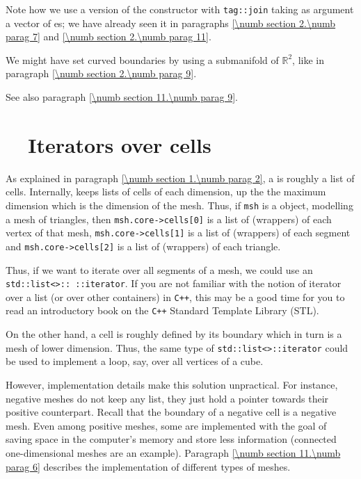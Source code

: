 Note how we use a version of the {\small\tt {}} constructor with {\small\tt \textcolor{tag}{tag}::join}
taking as argument a vector of {\small\tt {}}es; we have already seen it in paragraphs
\ref{\numb section 2.\numb parag 7} and \ref{\numb section 2.\numb parag 11}.

We might have set curved boundaries by using a submanifold of $ \mathbb{R}^2 $, like in paragraph
\ref{\numb section 2.\numb parag 9}.

See also paragraph \ref{\numb section 11.\numb parag 9}.


\section{~~Iterators over cells}\label{\numb section 9.\numb parag 3}

As explained in paragraph \ref{\numb section 1.\numb parag 2}, a {\small\tt {}} is
roughly a list of cells.
Internally, {\maniFEM} keeps lists of cells of each dimension, up the the maximum
dimension which is the dimension of the mesh.
Thus, if {\small\tt msh} is a {\small\tt {}} object, modelling a
mesh of triangles, then {\small\tt msh.core->cells[0]} is a list of (wrappers) of
each vertex of that mesh, {\small\tt msh.core->cells[1]} is a list of (wrappers) of
each segment and {\small\tt msh.core->cells[2]} is a list of (wrappers) of each triangle.

Thus, if we want to iterate over all segments of a mesh, we could use an
{\small\tt std::list<>:: ::iterator}.
If you are not familiar with the notion of iterator over a list (or over other containers)
in {\tt C++}, this may be a good time for you to read an introductory book on the
{\tt C++} Standard Template Library (STL).

On the other hand, a cell is roughly defined by its boundary which in turn is a mesh of
lower dimension.
Thus, the same type of {\small\tt std::list<>::iterator} could be used to
implement a loop, say, over all vertices of a cube.

However, implementation details make this solution unpractical.
For instance, negative meshes do not keep any list,
they just hold a pointer towards their positive counterpart.
Recall that the boundary of a negative cell is a negative mesh.
Even among positive meshes, some are implemented with the goal of saving space in the
computer's memory and store less information (connected one-dimensional meshes are an
example).
Paragraph \ref{\numb section 11.\numb parag 6} describes the implementation of different
types of meshes.

